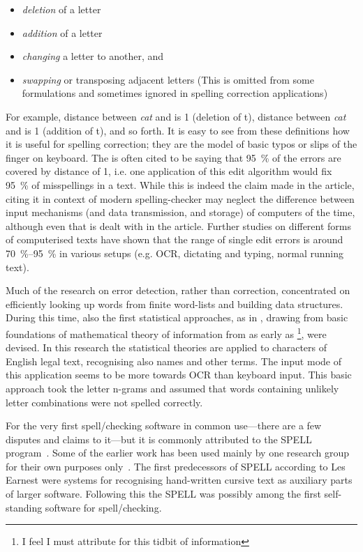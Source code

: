 \documentclass[officiallayout]{unihelcompling}
\newcommand\misspelt{\bgroup\markoverwith
{\textcolor{red}{\lower3.5pt\hbox{\sixly \char58}}}\ULon}
\begin{document}
\begin{itemize}
    \item \emph{deletion} of a letter
    \item \emph{addition} of a letter
    \item \emph{changing} a letter to another, and
    \item \emph{swapping} or transposing adjacent letters
        (This is omitted from some formulations and sometimes ignored in
        spelling correction applications)
\end{itemize}

For example, distance between \emph{cat} and \misspelt{ca} is 1 (deletion of
t), distance between \emph{cat} and \misspelt{catt} is 1 (addition of t), and
so forth.  It is easy to see from these definitions how it is useful for
spelling correction; they are the model of basic typos or slips of the finger
on keyboard. The \citep{damerau1964technique} is often cited to be saying that
95~\% of the errors are covered by distance of 1, i.e. one application of this
edit algorithm would fix 95~\% of misspellings in a text. While this is indeed
the claim made in the article, citing it in context of modern spelling-checker
may neglect the difference between input mechanisms (and data transmission, and
storage) of computers of the time, although even that is dealt with in the
article. Further studies on different forms of computerised texts have shown
that the range of single edit errors is around 70~\%--95~\% in various setups
(e.g. OCR, dictating and typing, normal running text).

Much of the research on error detection, rather than correction, concentrated
on efficiently looking up words from finite word-lists and building data
structures. During this time, also the first statistical approaches, as in
\citet{raviv1967decision}, drawing from basic foundations of mathematical
theory of information from as early as
\citet{shannon1948mathematical}\footnote{I feel I must attribute
\citet{liberman2012noisily} for this tidbit of information}, were devised. In
this research the statistical theories are applied to characters of English
legal text, recognising also names and other terms. The input mode of this
application seems to be more towards OCR than keyboard input. This basic
approach took the letter n-grams and assumed that words containing unlikely
letter combinations were not spelled correctly.

For the very first spell\-/checking software in common use---there are a few
disputes and claims to it---but it is commonly attributed to the SPELL
program~\citep{gorin1971spell}.  Some of the earlier work has been used mainly
by one research group for their own purposes 
only~\citep{earnest2011first,earnest2012first}. The first predecessors of SPELL
according to Les Earnest were systems for recognising hand-written cursive text
as auxiliary parts of larger software. Following this the SPELL was possibly
among the first self-standing software for spell\-/checking.
\end{document}
